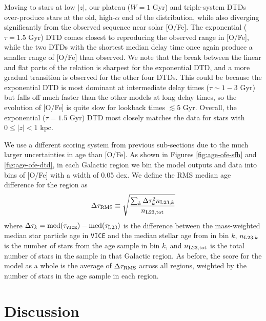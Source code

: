 \documentclass[twocolumn,twocolappendix,linenumbers,trackchanges]{aastex631}
\newcommand{\vice}{{\tt VICE}\xspace}
\begin{document}
Moving to stars at low $|z|$, our plateau ($W=1$ Gyr) and triple-system DTDs over-produce stars at the old, high-$\alpha$ end of the distribution, while also diverging significantly from the observed sequence near solar [O/Fe]. The exponential ($\tau=1.5$ Gyr) DTD comes closest to reproducing the observed range in [O/Fe], while the two DTDs with the shortest median delay time once again produce a smaller range of [O/Fe] than observed. We note that the break between the linear and flat parts of the relation is sharpest for the exponential DTD, and a more gradual transition is observed for the other four DTDs. This could be because the exponential DTD is most dominant at intermediate delay times ($\tau\sim 1-3$ Gyr) but falls off much faster than the other models at long delay times, so the evolution of [O/Fe] is quite slow for lookback times $\lesssim 5$ Gyr. Overall, the exponential ($\tau=1.5$ Gyr) DTD most closely matches the data for stars with $0\leq|z|<1$ kpc.

We use a different scoring system from previous sub-sections due to the much larger uncertainties in age than [O/Fe]. As shown in Figures \ref{fig:age-ofe-sfh} and \ref{fig:age-ofe-dtd}, in each Galactic region we bin the model outputs and data into bins of [O/Fe] with a width of 0.05 dex. We define the RMS median age difference for the region as
\begin{equation}
    \Delta\tau_{\rm RMS} \equiv \sqrt{\frac{\sum_k \Delta\tau_k^2 n_{{\rm L23},k}}{n_{\rm L23,tot}}}
    \label{eq:age-ofe-score}
\end{equation}
where $\Delta\tau_k=\rm{med}(\tau_{\rm \vice})-\rm{med}(\tau_{\rm L23})$ is the difference between the mass-weighted median star particle age in \vice and the median stellar age from  in bin $k$, $n_{{\rm L23},k}$ is the number of stars from the  age sample in bin $k$, and $n_{\rm L23,tot}$ is the total number of stars in the sample in that Galactic region. As before, the score for the model as a whole is the average of $\Delta \tau_{\rm RMS}$ across all regions, weighted by the number of stars in the age sample in each region.


\section{Discussion}
\label{sec:discussion}

\vspace{-24pt}
\end{document}
